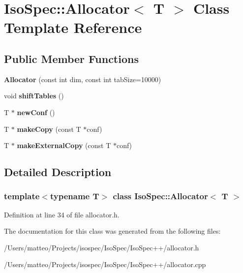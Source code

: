 \hypertarget{class_iso_spec_1_1_allocator}{}\section{Iso\+Spec\+:\+:Allocator$<$ T $>$ Class Template Reference}
\label{class_iso_spec_1_1_allocator}
\subsection*{Public Member Functions}
\begin{DoxyCompactItemize}
\item 
\mbox{\label{class_iso_spec_1_1_allocator_a30f7d0aedcf0cf85e958d66aa7ce0ec7}} 
{\bfseries Allocator} (const int dim, const int tab\+Size=10000)
\item 
\mbox{\label{class_iso_spec_1_1_allocator_afee0ae1b40ebb05545e7ca29a8319989}} 
void {\bfseries shift\+Tables} ()
\item 
\mbox{\label{class_iso_spec_1_1_allocator_aca2253867d95eb50e170d00a01fb6507}} 
T $\ast$ {\bfseries new\+Conf} ()
\item 
\mbox{\label{class_iso_spec_1_1_allocator_a4845b8c1c32e1828903fb71af604a2b1}} 
T $\ast$ {\bfseries make\+Copy} (const T $\ast$conf)
\item 
\mbox{\label{class_iso_spec_1_1_allocator_ada9bd9a7168a79c53214fdb0fc66ecf5}} 
T $\ast$ {\bfseries make\+External\+Copy} (const T $\ast$conf)
\end{DoxyCompactItemize}


\subsection{Detailed Description}
\subsubsection*{template$<$typename T$>$\newline
class Iso\+Spec\+::\+Allocator$<$ T $>$}



Definition at line 34 of file allocator.\+h.



The documentation for this class was generated from the following files\+:\begin{DoxyCompactItemize}
\item 
/\+Users/matteo/\+Projects/isospec/\+Iso\+Spec/\+Iso\+Spec++/allocator.\+h\item 
/\+Users/matteo/\+Projects/isospec/\+Iso\+Spec/\+Iso\+Spec++/allocator.\+cpp\end{DoxyCompactItemize}
